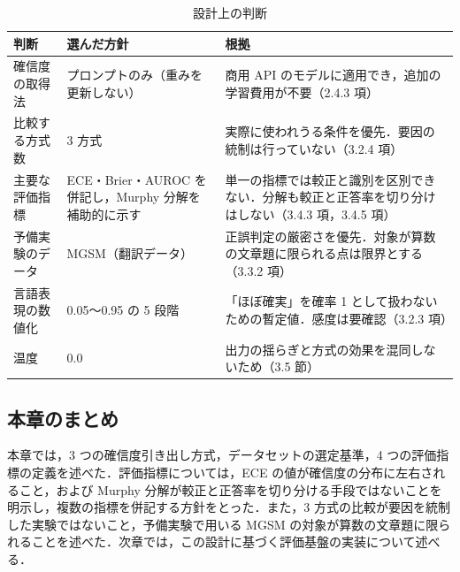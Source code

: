 \begin{table}[t]
\centering
\small
\caption{設計上の判断}
\label{tab:3.4}
\begin{tabularx}{\textwidth}{|l|X|X|}
\hline
判断 & 選んだ方針 & 根拠 \\
\hline
確信度の取得法 & プロンプトのみ（重みを更新しない） & 商用 API のモデルに適用でき，追加の学習費用が不要（2.4.3 項） \\
比較する方式数 & 3 方式 & 実際に使われうる条件を優先．要因の統制は行っていない（3.2.4 項） \\
主要な評価指標 & ECE・Brier・AUROC を併記し，Murphy 分解を補助的に示す & 単一の指標では較正と識別を区別できない．分解も較正と正答率を切り分けはしない（3.4.3 項，3.4.5 項） \\
予備実験のデータ & MGSM（翻訳データ） & 正誤判定の厳密さを優先．対象が算数の文章題に限られる点は限界とする（3.3.2 項） \\
言語表現の数値化 & 0.05〜0.95 の 5 段階 & 「ほぼ確実」を確率 1 として扱わないための暫定値．感度は要確認（3.2.3 項） \\
温度 & 0.0 & 出力の揺らぎと方式の効果を混同しないため（3.5 節） \\
\hline
\end{tabularx}
\end{table}

\subsection{本章のまとめ}

本章では，3 つの確信度引き出し方式，データセットの選定基準，4 つの評価指標の定義を述べた．評価指標については，ECE の値が確信度の分布に左右されること，および Murphy 分解が較正と正答率を切り分ける手段ではないことを明示し，複数の指標を併記する方針をとった．また，3 方式の比較が要因を統制した実験ではないこと，予備実験で用いる MGSM の対象が算数の文章題に限られることを述べた．次章では，この設計に基づく評価基盤の実装について述べる．
